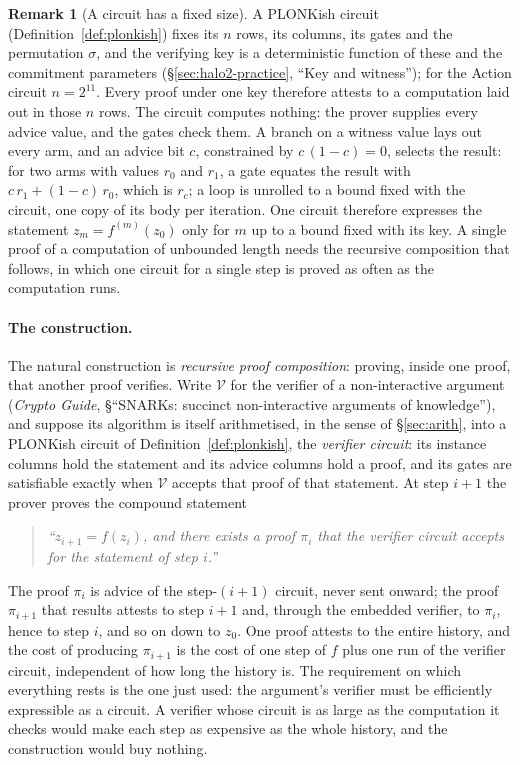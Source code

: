 \documentclass[11pt,a4paper]{article}
\theoremstyle{definition}
\newtheorem{remark}[theorem]{Remark}
\newcommand{\Ver}{\mathcal{V}}
\begin{document}
\begin{remark}[A circuit has a fixed size]\label{rem:pcd-fixed-size}
A PLONKish circuit (Definition~\ref{def:plonkish}) fixes its $n$ rows,
its columns, its gates and the permutation $\sigma$, and the verifying
key is a deterministic function of these and the commitment parameters
(\S\ref{sec:halo2-practice}, ``Key and witness''); for the Action circuit
$n = 2^{11}$. Every proof under one key therefore attests to a
computation laid out in those $n$ rows. The circuit computes nothing: the
prover supplies every advice value, and the gates check them. A branch on
a witness value lays out every arm, and an advice bit $c$, constrained by
$c\,(1 - c) = 0$, selects the result: for two arms with values $r_0$ and
$r_1$, a gate equates the result with $c\,r_1 + (1 - c)\,r_0$, which is
$r_c$; a loop is unrolled to a bound fixed with the circuit, one copy of
its body per iteration. One circuit therefore expresses the statement
$z_m = f^{(m)}(z_0)$ only for $m$ up to a bound fixed with its key. A
single proof of a computation of unbounded length needs the recursive
composition that follows, in which one circuit for a single step is
proved as often as the computation runs.
\end{remark}

\paragraph{The construction.}
The natural construction is \emph{recursive proof composition}: proving,
inside one proof, that another proof verifies. Write $\Ver$ for the
verifier of a non-interactive argument (\emph{Crypto Guide}, \S``SNARKs:
succinct non-interactive arguments of knowledge''), and suppose its
algorithm is itself arithmetised, in the sense of \S\ref{sec:arith},
into a PLONKish circuit of Definition~\ref{def:plonkish}, the
\emph{verifier circuit}: its instance columns hold the statement and
its advice columns hold a proof, and its gates are satisfiable exactly
when $\Ver$ accepts that proof of that statement. At step $i + 1$ the
prover proves the compound statement
\begin{quote}
\emph{``$z_{i+1} = f(z_i)$, and there exists a proof $\pi_i$ that the
verifier circuit accepts for the statement of step $i$.''}
\end{quote}
The proof $\pi_i$ is advice of the step-$(i+1)$ circuit, never sent
onward; the proof $\pi_{i+1}$ that results attests to step $i + 1$ and,
through the embedded verifier, to $\pi_i$, hence to step $i$, and so on
down to $z_0$. One proof attests to the entire history, and the cost of
producing $\pi_{i+1}$ is the cost of one step of $f$ plus one run of
the verifier circuit, independent of how long the history is. The
requirement on which everything rests is the one just used: the
argument's verifier must be efficiently expressible as a circuit. A
verifier whose circuit is as large as the computation it checks would
make each step as expensive as the whole history, and the construction
would buy nothing.
\end{document}
